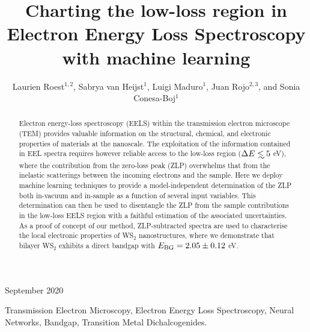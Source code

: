 \documentclass[11pt]{iopart}
\def\lsim{\mathrel{\rlap{\lower4pt\hbox{\hskip1pt$\sim$}}
    \raise1pt\hbox{$<$}}}
\begin{document}

\title[Charting Electron Energy Loss Spectroscopy with machine learning]{Charting the low-loss region in Electron Energy Loss Spectroscopy with machine learning}

\author{Laurien Roest$^{1,2}$, Sabrya van Heijst$^{1}$,
  Luigi Maduro$^{1}$,
  Juan Rojo$^{2,3}$, and Sonia Conesa-Boj$^{1}$}
\address{$^{1}$Kavli Institute of Nanoscience, Delft University of Technology, 2628CJ Delft, The
  Netherlands\\
$^{2}$Nikhef Theory Group, Science Park 105, 1098 XG Amsterdam, The
  Netherlands \\$^{3}$Department of Physics and Astronomy, VU,
  1081 HV Amsterdam, The Netherlands}

\vspace{10pt}
\begin{indented}
\item[]September 2020
\end{indented}



\begin{abstract}
  Electron energy-loss spectroscopy (EELS) within the
  transmission electron microscope (TEM) provides valuable information on the structural, chemical, and electronic properties of materials at the nanoscale.
%
%
The exploitation of the information contained in EEL spectra requires
however reliable
access to the
low-loss region ($\Delta E\lsim 5$ eV),
where the contribution from the zero-loss peak (ZLP) overwhelms
that from
the inelastic scatterings between the incoming electrons and the sample.
%
Here we deploy machine learning techniques
to provide a model-independent determination of the ZLP
both in-vacuum and in-sample as a function of several input variables.
%
This determination can then be used to disentangle
the ZLP from the sample contributions in the low-loss EELS
region
with a faithful estimation of the associated uncertainties.
%
As a proof of concept of our  method, ZLP-subtracted
spectra are used to characterise the local electronic properties of
WS$_2$ nanostructures, where we demonstrate that bilayer WS$_2$ exhibits a direct bandgap
with $E_{\rm BG}= 2.05 \pm 0.12$ eV.
\end{abstract}

 {\small Transmission Electron Microscopy,
Electron Energy Loss Spectroscopy, Neural Networks, Bandgap, Transition
Metal Dichalcogenides.}\\
\end{document}
